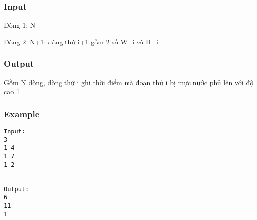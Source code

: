 \subsubsection{Input}

Dòng 1: N

Dòng 2..N+1: dòng thứ i+1 gồm 2 số W\_i và H\_i

\subsubsection{Output}

Gồm N dòng, dòng thứ i ghi thời điểm mà đoạn thứ i bị mực nước phủ lên với độ cao 1

\subsubsection{Example}
\begin{verbatim}
Input:
3
1 4
1 7
1 2


Output:
6
11
1

\end{verbatim}
